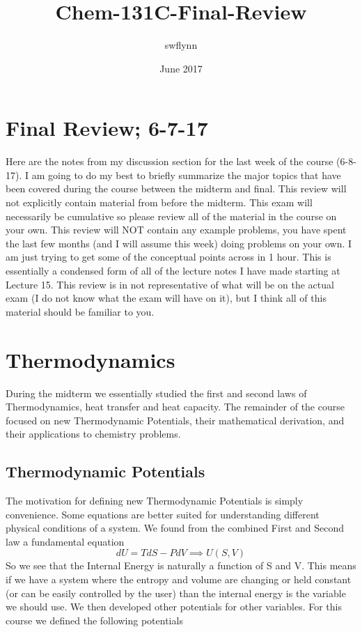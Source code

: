 \documentclass{article}
\title{Chem-131C-Final-Review}
\author{swflynn }
\date{June 2017}
\begin{document}
\maketitle

\section*{Final Review; 6-7-17}
Here are the notes from my discussion section for the last week of the course (6-8-17). 
I am going to do my best to briefly summarize the major topics that have been covered during the course between the midterm and final. 
This review will not explicitly contain material from before the midterm. 
This exam will necessarily be cumulative so please review all of the material in the course on your own. 
This review will NOT contain any example problems, you have spent the last few months (and I will assume this week) doing problems on your own.
I am just trying to get some of the conceptual points across in 1 hour. 
This is essentially a condensed form of all of the lecture notes I have made starting at Lecture 15.
This review is in not representative of what will be on the actual exam (I do not know what the exam will have on it), but I think all of this material should be familiar to you.

\section{Thermodynamics}
During the midterm we essentially studied the first and second laws of Thermodynamics, heat transfer and heat capacity.
The remainder of the course focused on new Thermodynamic Potentials, their mathematical derivation, and their applications to chemistry problems. 

\subsection{Thermodynamic Potentials}
The motivation for defining new Thermodynamic Potentials is simply convenience. 
Some equations are better suited for understanding different physical conditions of a system.
We found from the combined First and Second law a fundamental equation
\begin{equation}
    dU = TdS - PdV \implies U(S,V)
\end{equation}
So we see that the Internal Energy is naturally a function of S and V.
This means if we have a system where the entropy and volume are changing or held constant (or can be easily controlled by the user) than the internal energy is the variable we should use. 
We then developed other potentials for other variables. 
For this course we defined the following potentials\\
\end{document}
